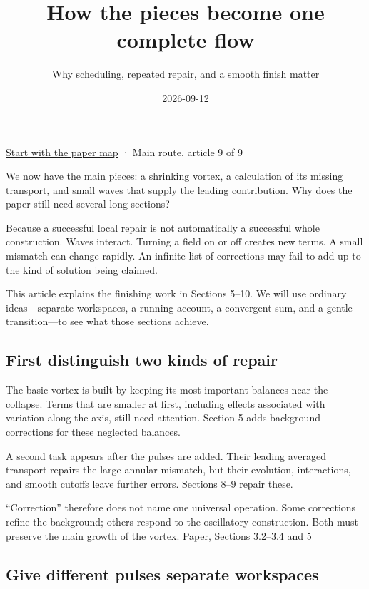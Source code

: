 \documentclass[
  english,
  11pt,
]{article}
\title{How the pieces become one complete flow}
\subtitle{Why scheduling, repeated repair, and a smooth finish matter}
\author{}
\date{2026-09-12}
\begin{document}
\maketitle


\href{../paper-map/article.html}{Start with the paper map} · Main route,
article 9 of 9

We now have the main pieces: a shrinking vortex, a calculation of its
missing transport, and small waves that supply the leading contribution.
Why does the paper still need several long sections?

Because a successful local repair is not automatically a successful
whole construction. Waves interact. Turning a field on or off creates
new terms. A small mismatch can change rapidly. An infinite list of
corrections may fail to add up to the kind of solution being claimed.

This article explains the finishing work in Sections 5--10. We will use
ordinary ideas---separate workspaces, a running account, a convergent
sum, and a gentle transition---to see what those sections achieve.

\subsection{First distinguish two kinds of
repair}\label{first-distinguish-two-kinds-of-repair}

The basic vortex is built by keeping its most important balances near
the collapse. Terms that are smaller at first, including effects
associated with variation along the axis, still need attention. Section
5 adds background corrections for these neglected balances.

A second task appears after the pulses are added. Their leading averaged
transport repairs the large annular mismatch, but their evolution,
interactions, and smooth cutoffs leave further errors. Sections 8--9
repair these.

``Correction'' therefore does not name one universal operation. Some
corrections refine the background; others respond to the oscillatory
construction. Both must preserve the main growth of the vortex.
\href{https://cdn.openai.com/pdf/32d9f210-8b73-45e0-91bc-82a30aef8a9a/navier-stokes.pdf}{Paper,
Sections 3.2--3.4 and 5}

\subsection{Give different pulses separate
workspaces}\label{give-different-pulses-separate-workspaces}
\end{document}

